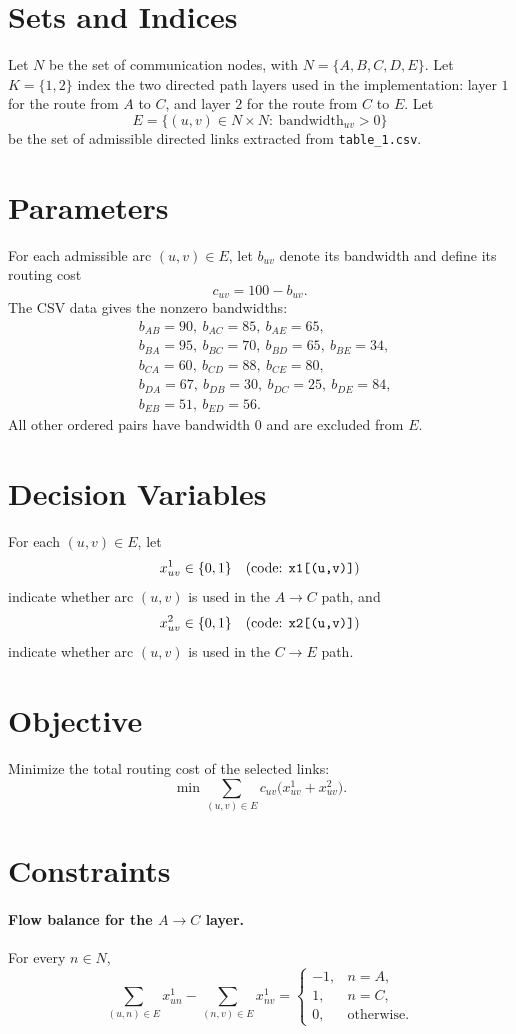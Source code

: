 \section*{Sets and Indices}
Let $N$ be the set of communication nodes, with $N=\{A,B,C,D,E\}$.
Let $K=\{1,2\}$ index the two directed path layers used in the implementation: layer $1$ for the route from $A$ to $C$, and layer $2$ for the route from $C$ to $E$.
Let
\[
E=\{(u,v)\in N\times N:\ \text{bandwidth}_{uv}>0\}
\]
be the set of admissible directed links extracted from \texttt{table\_1.csv}.

\section*{Parameters}
For each admissible arc $(u,v)\in E$, let $b_{uv}$ denote its bandwidth and define its routing cost
\[
c_{uv}=100-b_{uv}.
\]
The CSV data gives the nonzero bandwidths:
\[
\begin{aligned}
&b_{AB}=90,\ b_{AC}=85,\ b_{AE}=65,\\
&b_{BA}=95,\ b_{BC}=70,\ b_{BD}=65,\ b_{BE}=34,\\
&b_{CA}=60,\ b_{CD}=88,\ b_{CE}=80,\\
&b_{DA}=67,\ b_{DB}=30,\ b_{DC}=25,\ b_{DE}=84,\\
&b_{EB}=51,\ b_{ED}=56.
\end{aligned}
\]
All other ordered pairs have bandwidth $0$ and are excluded from $E$.

\section*{Decision Variables}
For each $(u,v)\in E$, let
\[
x^{1}_{uv}\in\{0,1\} \quad \text{(code: \texttt{x1[(u,v)]})}
\]
indicate whether arc $(u,v)$ is used in the $A\to C$ path, and
\[
x^{2}_{uv}\in\{0,1\} \quad \text{(code: \texttt{x2[(u,v)]})}
\]
indicate whether arc $(u,v)$ is used in the $C\to E$ path.

\section*{Objective}
Minimize the total routing cost of the selected links:
\[
\min \sum_{(u,v)\in E} c_{uv}\bigl(x^{1}_{uv}+x^{2}_{uv}\bigr).
\]

\section*{Constraints}
\paragraph{Flow balance for the $A\to C$ layer.}
For every $n\in N$,
\[
\sum_{(u,n)\in E} x^{1}_{un}-\sum_{(n,v)\in E} x^{1}_{nv}=
\begin{cases}
-1, & n=A,\\
1, & n=C,\\
0, & \text{otherwise}.
\end{cases}
\]

